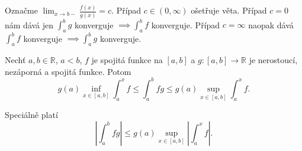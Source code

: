 \begin{poznamka}
	Označme $\lim_{x\to b-} \frac{f(x)}{g(x)}=c$. Případ $c\in (0,\infty)$ ošetřuje věta.
	Případ $c=0$ nám dává jen $\int_a^b g $ konverguje $\implies \int_a^b f$ konverguje. Případ $c=\infty$
	naopak dává $\int_a^b f$ konverguje $\implies \int_a^b g$ konverguje.
\end{poznamka}

\begin{lemma}\label{lemma8.37}
Nechť $a, b \in \mathbb{R}$, $a < b$, $f$ je spojitá funkce na $[a, b]$ a $g : [a, b] \to \mathbb{R}$ je nerostoucí, nezáporná a spojitá funkce. Potom
\[
g(a)\inf_{x \in [a,b]} \int_a^x f
\leq
\int_a^b fg
\leq
g(a)\sup_{x \in [a,b]} \int_a^x f.
\]

Speciálně platí
\[
\left| \int_a^b fg \right|
\leq
g(a)\sup_{x \in [a,b]}
\left| \int_a^x f \right|.
\]
\end{lemma}

